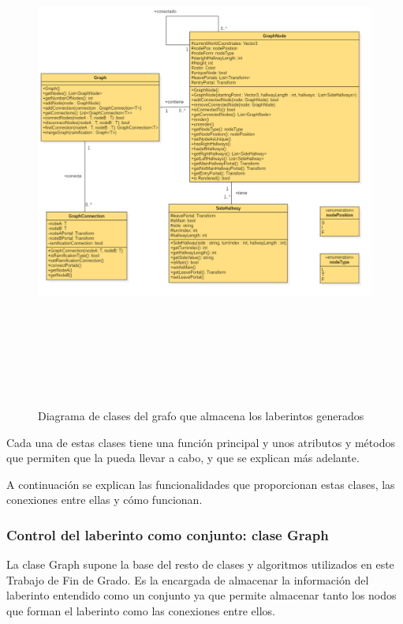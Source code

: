 \documentclass[../main.tex]{subfiles}
\begin{document}
\begin{figure}[h!]
\hspace{-2.75cm}
\includegraphics[width=1.5\textwidth, height = 17cm]{imagenes/Class_Diagram_TFG.png}
\caption{Diagrama de clases del grafo que almacena los laberintos generados}
\label{fig:Class_Diagram}
\end{figure}

Cada una de estas clases tiene una función principal y unos atributos y métodos que permiten que la pueda llevar a cabo, y que se explican más adelante.

A continuación se explican las funcionalidades que proporcionan estas clases, las conexiones entre ellas y cómo funcionan.

\subsubsection{Control del laberinto como conjunto: clase Graph}

La clase Graph supone la base del resto de clases y algoritmos utilizados en este Trabajo de Fin de Grado. Es la encargada de almacenar la información del laberinto entendido como un conjunto ya que permite almacenar tanto los nodos que forman el laberinto como las conexiones entre ellos.
\end{document}
